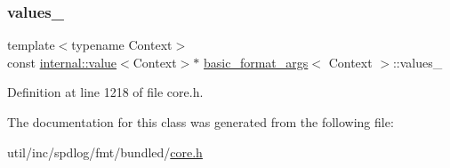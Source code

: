 \subsubsection{\texorpdfstring{values\+\_\+}{values\_}}
{\footnotesize\ttfamily template$<$typename Context$>$ \\
const \hyperlink{classinternal_1_1value}{internal\+::value}$<$Context$>$$\ast$ \hyperlink{classbasic__format__args}{basic\+\_\+format\+\_\+args}$<$ Context $>$\+::values\+\_\+}



Definition at line 1218 of file core.\+h.



The documentation for this class was generated from the following file\+:\begin{DoxyCompactItemize}
\item 
util/inc/spdlog/fmt/bundled/\hyperlink{core_8h}{core.\+h}\end{DoxyCompactItemize}
